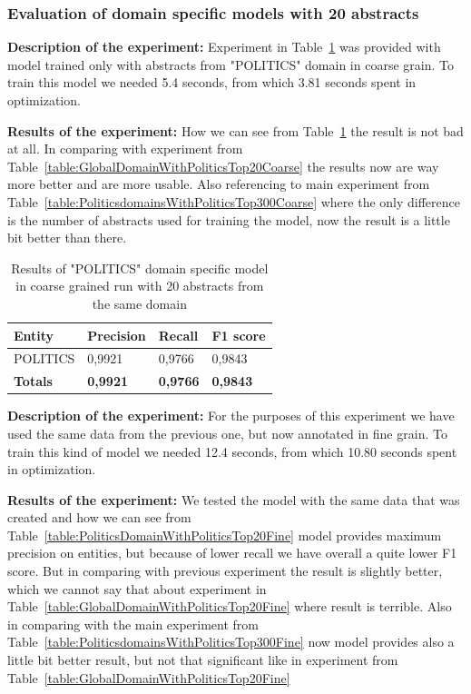 \documentclass[thesis=M,english]{FITthesis}[2018/05/30]
\begin{document}

\subsubsection{Evaluation of domain specific models with 20 abstracts}

\textbf{Description of the experiment:} Experiment in Table~\ref{table:PoliticsDomainWithPoliticsTop20Coarse} was provided with model trained only with abstracts from "POLITICS" domain in coarse grain. To train this model we needed 5.4 seconds, from which 3.81 seconds spent in optimization.

\textbf{Results of the experiment:} How we can see from Table~\ref{table:PoliticsDomainWithPoliticsTop20Coarse} the result is not bad at all. In comparing with experiment from Table~\ref{table:GlobalDomainWithPoliticsTop20Coarse} the results now are way more better and are more usable. Also referencing to main experiment from Table~\ref{table:PoliticsdomainsWithPoliticsTop300Coarse} where the only difference is the number of abstracts used for training the model, now the result is a little bit better than there.  
	
	\begin{table}[H]\centering
		\begin{tabular}{|l|l|l|l|}
			\hline {\textbf{Entity}} & {\textbf{Precision}} & {\textbf{Recall}} & {\textbf{F1 score}}\\\hline
				POLITICS & 0,9921 & 0,9766 & 0,9843\\\hline
				\textbf{Totals} & \textbf{0,9921} & \textbf{0,9766} & \textbf{0,9843}\\\hline
		\end{tabular}
		\caption{Results of "POLITICS" domain specific model in coarse grained run with 20 abstracts from the same domain \label{table:PoliticsDomainWithPoliticsTop20Coarse}}		
	\end{table}	
	
\textbf{Description of the experiment:} For the purposes of this experiment we have used the same data from the previous one, but now annotated in fine grain. To train this kind of model we needed 12.4 seconds, from which 10.80 seconds spent in optimization.  

\textbf{Results of the experiment:} We tested the model with the same data that was created and how we can see from Table~\ref{table:PoliticsDomainWithPoliticsTop20Fine} model provides maximum precision on entities, but because of lower recall we have overall a quite lower F1 score. But in comparing with previous experiment the result is slightly better, which we cannot say that about experiment in Table~\ref{table:GlobalDomainWithPoliticsTop20Fine} where result is terrible. Also in comparing with the main experiment from Table~\ref{table:PoliticsdomainsWithPoliticsTop300Fine} now model provides also a little bit better result, but not that significant like in experiment from Table~\ref{table:GlobalDomainWithPoliticsTop20Fine} 
	
\end{document}
